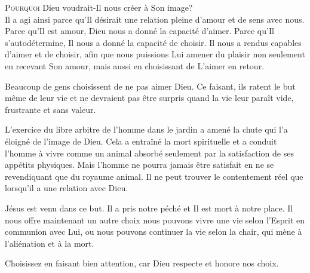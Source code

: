 \jrnlmonth






\lettrine{P}{ourquoi} Dieu voudrait-Il nous créer à Son image? \\[1ex]
Il a agi ainsi parce qu'Il désirait une relation pleine d'amour et de sens avec
 nous. Parce qu'Il est amour, Dieu nous a donné la capacité d'aimer. Parce qu'Il
 s'autodétermine, Il nous a donné la capacité de choisir. Il nous a rendus
 capables d'aimer et de choisir, afin que nous puissions Lui amener du plaisir
 \ocadr{}non seulement en recevant Son amour, mais aussi en choisissant de L'aimer
 en retour. 

Beaucoup de gens choisissent de ne pas aimer Dieu. Ce faisant, ils ratent le but
 même de leur vie et ne devraient pas être surpris quand la vie leur paraît vide,
 frustrante et sans valeur.


L'exercice du libre arbitre de l'homme dans le jardin a amené la chute qui l'a
 éloigné de l'image de Dieu. Cela a entraîné la mort spirituelle et a conduit
 l'homme à vivre comme un animal \ocadr{}absorbé seulement par la satisfaction de ses
 appétits physiques. Mais l'homme ne pourra jamais être satisfait en ne se
 revendiquant que du royaume animal. Il ne peut trouver le contentement
 réel que lorsqu'il a une relation avec Dieu. 

Jésus est venu dans ce but. Il a pris notre péché et Il est mort à notre place.
 Il nous offre maintenant un autre choix \ocadr{}nous pouvons vivre une vie selon
 l'Esprit en communion avec Lui, ou nous pouvons continuer la vie selon la chair,
 qui mène à l'aliénation et à la mort. 

Choisissez en faisant bien attention, car Dieu respecte et honore nos choix. 

